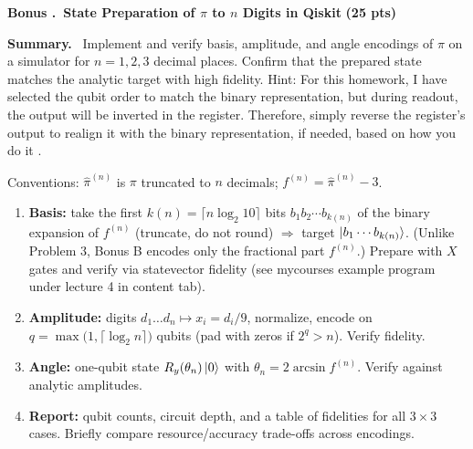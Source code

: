 \documentclass[11pt]{article}
\newcommand{\pts}[1]{\hfill{\small\bfseries(#1 pts)}}
\newenvironment{summary}{\vspace{2pt}\noindent\textbf{Summary.}~}{\par\vspace{6pt}}
\newcounter{bonus}
\newcommand{\bonus}[2]{%
  \refstepcounter{bonus}
  \vspace{10pt}\noindent\textbf{Bonus \Alph{bonus}.~#1} \pts{#2}\par
}
\begin{document}
\bonus{State Preparation of \(\pi\) to \(n\) Digits in Qiskit}{25}
\begin{summary}
Implement and verify basis, amplitude, and angle encodings of $\pi$ on a simulator for $n=1,2,3$ decimal places. Confirm that the prepared state matches the analytic target with high fidelity. Hint: For this homework, I have selected the qubit order to match the binary representation, but during readout, the output will be inverted in the register. Therefore, simply reverse the register's output to realign it with the binary representation, if needed, based on how you do it \smiley{}.
\end{summary}

Conventions: $\hat\pi^{(n)}$ is $\pi$ truncated to $n$ decimals; $f^{(n)}=\hat\pi^{(n)}-3$.

\begin{enumerate}[label=(\alph*)]
  \item \textbf{Basis:} take the first $k(n)=\lceil n\log_2 10\rceil$ bits $b_1b_2\cdots b_{k(n)}$ of the binary expansion of $f^{(n)}$ (truncate, do not round) $\Rightarrow$ target $\ket{b_1\cdots b_{k(n)}}$. (Unlike Problem 3, Bonus B encodes only the fractional part $f^{(n)}$.) Prepare with $X$ gates and verify via statevector fidelity (see mycourses example program under lecture 4 in content tab).
  \item \textbf{Amplitude:} digits $d_1\ldots d_n\mapsto x_i=d_i/9$, normalize, encode on $q=\max\big(1,\lceil\log_2 n\rceil\big)$ qubits (pad with zeros if $2^q>n$). Verify fidelity.
  \item \textbf{Angle:} one-qubit state $R_y(\theta_n)\ket{0}$ with $\theta_n=2\arcsin f^{(n)}$. Verify against analytic amplitudes.
  \item \textbf{Report:} qubit counts, circuit depth, and a table of fidelities for all $3\times 3$ cases. Briefly compare resource/accuracy trade-offs across encodings.
\end{enumerate}
\end{document}
